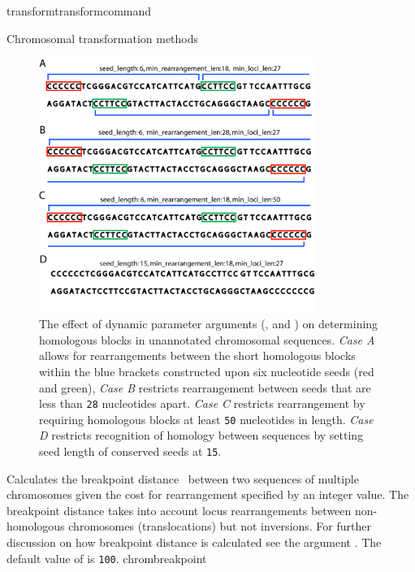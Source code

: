 \begin{command}{transform}{transformcommand}
\begin{arguments}
\begin{argumentgroup}{Chromosomal transformation methods}
\begin{description}
 			\begin{figure} [!htbp]
   		 	\begin{center}
        			\includegraphics[width=0.8\textwidth]{doc/figures/chromfig1.jpg}
    			\end{center}
    			\caption{The effect of dynamic parameter arguments (, 
			and ) on determining homologous blocks in unannotated chromosomal sequences.
			 \emph{Case A} allows for rearrangements between the short homologous blocks within the 				     
			blue brackets constructed upon six nucleotide seeds (red and green), \emph{Case B} 
			restricts rearrangement between seeds that are less than \texttt{28} nucleotides apart.
			 \emph{Case C} restricts rearrangement by requiring homologous blocks at least \texttt{50} nucleotides
			  in length. \emph{Case D} restricts recognition of homology between sequences by setting seed length
			   of conserved seeds at \texttt{15}.}
    		\label{fig:chrom}
		\end{figure}

      		     {Calculates the breakpoint distance~\cite{blanchetteetal1997}
                        between two sequences of multiple chromosomes given the cost for
                        rearrangement specified by an integer value. The breakpoint distance
                        takes into account locus rearrangements between non-homologous
                        chromosomes (translocations) but not inversions. For further discussion on 
                        how breakpoint distance is calculated see the argument .  
                        The default value of  is \texttt{100}.} 
                        {chrombreakpoint}


\end{description}
\end{argumentgroup}
\end{arguments}
\end{command}
